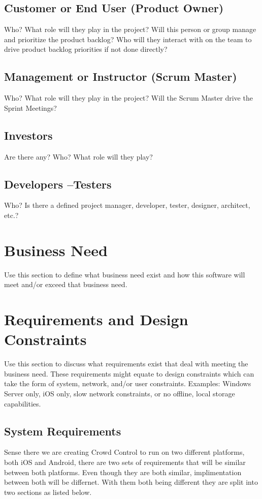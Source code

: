 \subsection{Customer or End User (Product Owner)}
Who?  What role will they play in the project?  Will this person or group manage 
and prioritize the product backlog?  Who will they interact with on the team to 
drive product backlog priorities if not done directly? 

\subsection{Management or Instructor (Scrum Master)}
Who?  What role will they play in the project?  Will the Scrum Master drive the 
Sprint Meetings? 


\subsection{Investors}
Are there any?  Who?  What role will they play? 


\subsection{Developers --Testers}
Who?  Is there a defined project manager, developer, tester, designer, architect, 
etc.? 


\section{Business Need}
Use this section to define what business need exist and how this software will 
meet and/or exceed that business need.   

\section{Requirements and Design Constraints}
Use this section to discuss what requirements exist that deal with meeting the 
business need.  These requirements might equate to design constraints which can 
take the form of system, network, and/or user constraints.  Examples:  Windows 
Server only, iOS only, slow network constraints, or no offline, local storage capabilities. 


\subsection{System  Requirements}
Sense there we are creating Crowd Control to run on two different platforms, both iOS and Android, there are two sets of requirements that will be similar between both platforms. Even though they are both similar, implimentation between both will be differnet. With them both being different they are split into two sections as listed below.

